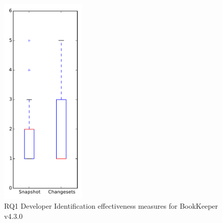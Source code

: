 
\begin{figure}[t]
\centering
\includegraphics[width=0.36\textwidth]{figures/dit/rq1_bookkeeper}
\caption{RQ1 Developer Identification effectiveness measures for BookKeeper v4.3.0}
\label{fig:dit:rq1:bookkeeper}
\end{figure}
